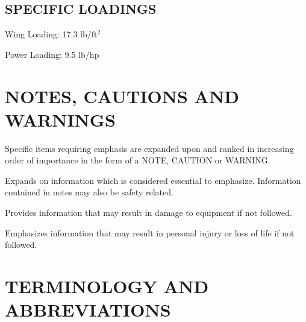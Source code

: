 \subsection{SPECIFIC LOADINGS} 
\begin{Description}
	\item[Wing Loading:]17.3 $\mathrm{lb/ft^{2}}$ 
	\item[Power Loading:]9.5 $\mathrm{lb/hp}$ 
\end{Description}

\section{NOTES, CAUTIONS AND WARNINGS} Specific items requiring emphasis are expanded upon and ranked in increasing order of importance in the form of a NOTE, CAUTION or WARNING.

\begin{Note}
  Expands on information which is considered essential to emphasize. Information contained in notes may also be safety related.
\end{Note}

\begin{NoteCtr}[CAUTION]
  Provides information that may result in damage to equipment if not followed.
  \end{NoteCtr}

\begin{NoteCtr}[WARNING]
  Emphasizes information that may result in personal injury or loss of life if not followed.
  \end{NoteCtr}


\section{TERMINOLOGY AND ABBREVIATIONS} 
